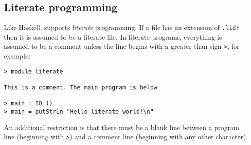 \subsection{Literate programming}

Like Haskell, \Idris{} supports \emph{literate} programming.
If a file has an extension of \texttt{.lidr} then it is assumed to be a literate file.
In literate programs, everything is assumed to be a comment unless the line begins with a greater than sign \texttt{>}, for example:

\begin{lstlisting}
> module literate

This is a comment. The main program is below

> main : IO ()
> main = putStrLn "Hello literate world!\n"
\end{lstlisting}

\noindent
An additional restriction is that there must be a blank line between a program line (beginning with \texttt{>}) and a comment line (beginning with any other character).
